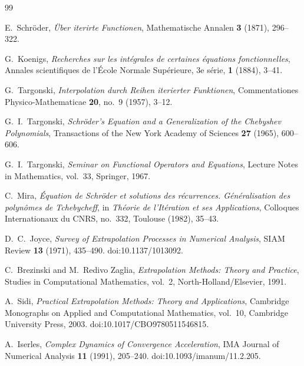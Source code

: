 \documentclass[11pt]{article}
\theoremstyle{remark}
\begin{document}
\begin{thebibliography}{99}
\raggedright

E.~Schr\"oder,
\newblock \emph{\"Uber iterirte Functionen},
\newblock Mathematische Annalen \textbf{3} (1871), 296--322.

G.~Koenigs,
\newblock \emph{Recherches sur les int\'egrales de certaines \'equations fonctionnelles},
\newblock Annales scientifiques de l'\'Ecole Normale Sup\'erieure, 3e s\'erie,
\textbf{1} (1884), 3--41.

G.~Targonski,
\newblock \emph{Interpolation durch Reihen iterierter Funktionen},
\newblock Commentationes Physico-Mathematicae \textbf{20}, no.~9 (1957), 3--12.

G.~I.~Targonski,
\newblock \emph{Schr\"oder's Equation and a Generalization of the Chebyshev Polynomials},
\newblock Transactions of the New York Academy of Sciences \textbf{27} (1965), 600--606.

G.~I.~Targonski,
\newblock \emph{Seminar on Functional Operators and Equations},
\newblock Lecture Notes in Mathematics, vol.~33, Springer, 1967.

C.~Mira,
\newblock \emph{\'Equation de Schr\"oder et solutions des r\'ecurrences.
G\'en\'eralisation des polyn\^omes de Tchebycheff},
\newblock in \emph{Th\'eorie de l'It\'eration et ses Applications},
Colloques Internationaux du CNRS, no.~332, Toulouse (1982), 35--43.

D.~C.~Joyce,
\newblock \emph{Survey of Extrapolation Processes in Numerical Analysis},
\newblock SIAM Review \textbf{13} (1971), 435--490.
\newblock doi:10.1137/1013092.

C.~Brezinski and M.~Redivo Zaglia,
\newblock \emph{Extrapolation Methods: Theory and Practice},
\newblock Studies in Computational Mathematics, vol.~2, North-Holland/Elsevier, 1991.

A.~Sidi,
\newblock \emph{Practical Extrapolation Methods: Theory and Applications},
\newblock Cambridge Monographs on Applied and Computational Mathematics, vol.~10,
Cambridge University Press, 2003.
\newblock doi:10.1017/CBO9780511546815.

A.~Iserles,
\newblock \emph{Complex Dynamics of Convergence Acceleration},
\newblock IMA Journal of Numerical Analysis \textbf{11} (1991), 205--240.
\newblock doi:10.1093/imanum/11.2.205.


\end{thebibliography}
\end{document}
